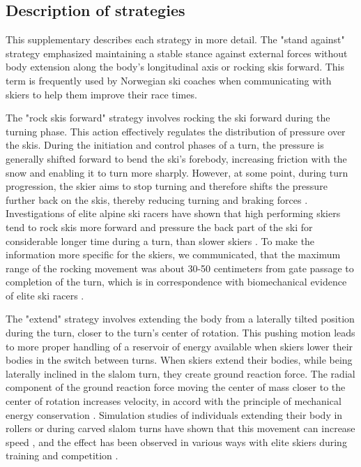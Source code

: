 \documentclass[pdflatex,sn-nature]{sn-jnl}%
\theoremstyle{thmstyleone}%
\theoremstyle{thmstyletwo}%
\theoremstyle{thmstylethree}%
\begin{document}
\begin{appendices}

\section{Description of strategies}\label{sup_strategies}
This supplementary describes each strategy in more detail. The "stand against" strategy emphasized maintaining a stable stance against external forces without body extension along the body's longitudinal axis or rocking skis forward. This term is frequently used by Norwegian ski coaches when communicating with skiers to help them improve their race times. 

The "rock skis forward" strategy involves rocking the ski forward during the turning phase. This action effectively regulates the distribution of pressure over the skis. During the initiation and control phases of a turn, the pressure is generally shifted forward to bend the ski's forebody, increasing friction with the snow and enabling it to turn more sharply. However, at some point, during turn progression, the skier aims to stop turning and therefore shifts the pressure further back on the skis, thereby reducing turning and braking forces \cite{lemaster_skiers_1999, lemaster_ultimate_2010}. Investigations of elite alpine ski racers have shown that high performing skiers tend to rock skis more forward and pressure the back part of the ski for considerable longer time during a turn, than slower skiers \cite{reid_kinematic_2010, tjorhom_beskrivelse_2007, reid_alpine_2020}. To make the information more specific for the skiers, we communicated, that the maximum range of the rocking movement was about 30-50 centimeters from gate passage to completion of the turn, which is in correspondence with biomechanical evidence of elite ski racers \cite{reid_kinematic_2010}. 

The "extend" strategy involves extending the body from a laterally tilted position during the turn, closer to the turn's center of rotation. This pushing motion leads to more proper handling of a reservoir of energy available when skiers lower their bodies in the switch between turns. When skiers extend their bodies, while being laterally inclined in the slalom turn, they create ground reaction force. The radial component of the ground reaction force moving the center of mass closer to the center of rotation increases velocity, in accord with the principle of mechanical energy conservation \cite{lind_physics_2013}. Simulation studies of individuals extending their body in rollers or during carved slalom turns have shown that this movement can increase speed \cite{mote_accelerations_1983,luginbuhl_identification_2023}, and the effect has been observed in various ways with elite skiers during training and competition \cite{reid_kinematic_2010, magelssen_is_2022, supej_differential_2008}. 


\end{appendices}
\end{document}
